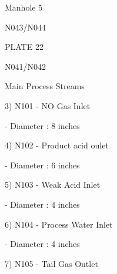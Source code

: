 \documentclass[a4paper,portrait,12pt]{article}
\begin{document}
\begin{flushleft}
Manhole 5
\end{flushleft}


\begin{flushleft}
N043/N044
\end{flushleft}





\begin{flushleft}
PLATE 22
\end{flushleft}





\begin{flushleft}
N041/N042
\end{flushleft}





\begin{flushleft}
Main Process Streams
\end{flushleft}


\begin{flushleft}
3) N101 - NO Gas Inlet
\end{flushleft}


\begin{flushleft}
- Diameter : 8 inches
\end{flushleft}


\begin{flushleft}
4) N102 - Product acid oulet
\end{flushleft}


\begin{flushleft}
- Diameter : 6 inches
\end{flushleft}


\begin{flushleft}
5) N103 - Weak Acid Inlet
\end{flushleft}


\begin{flushleft}
- Diameter : 4 inches
\end{flushleft}


\begin{flushleft}
6) N104 - Process Water Inlet
\end{flushleft}


\begin{flushleft}
- Diameter : 4 inches
\end{flushleft}


\begin{flushleft}
7) N105 - Tail Gas Outlet
\end{flushleft}
\end{document}

